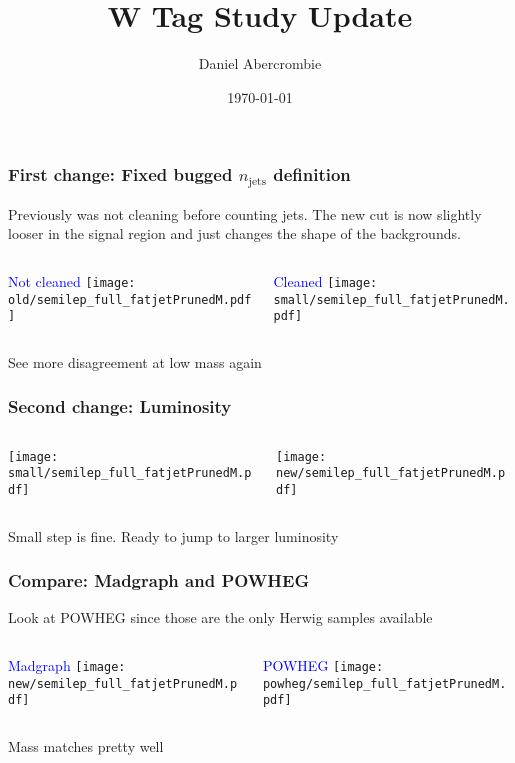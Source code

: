 \documentclass{beamer}
\author[D. Abercrombie]{
  Daniel Abercrombie
}
\title{\bf \sffamily W Tag Study Update}
\date{\today}
\begin{document}
\begin{frame}[nonumbering]
  \titlepage
\end{frame}

\begin{frame}
  \frametitle{First change: Fixed bugged $n_\text{jets}$ definition}
  Previously was not cleaning before counting jets.
  The new cut is now slightly looser in the signal region and just changes the shape of the backgrounds.
  \vspace{6pt}
  \begin{columns}
    \begin{column}{0.5\linewidth}
      \centering
      \textcolor{blue}{Not cleaned}
      \texttt{[image: old/semilep\_full\_fatjetPrunedM.pdf]}
    \end{column}
    \begin{column}{0.5\linewidth}
      \centering
      \textcolor{blue}{Cleaned}
      \texttt{[image: small/semilep\_full\_fatjetPrunedM.pdf]}
    \end{column}
  \end{columns}
  See more disagreement at low mass again
\end{frame}

\begin{frame}
  \frametitle{Second change: Luminosity}
  \begin{columns}
    \begin{column}{0.5\linewidth}
      \centering
      \texttt{[image: small/semilep\_full\_fatjetPrunedM.pdf]}
    \end{column}
    \begin{column}{0.5\linewidth}
      \centering
      \texttt{[image: new/semilep\_full\_fatjetPrunedM.pdf]}
    \end{column}
  \end{columns}
  Small step is fine. Ready to jump to larger luminosity
\end{frame}

\begin{frame}
  \frametitle{Compare: Madgraph and POWHEG}
  Look at POWHEG since those are the only Herwig samples available
  \vspace{6pt}
  \begin{columns}
    \begin{column}{0.5\linewidth}
      \centering
      \textcolor{blue}{Madgraph}
      \texttt{[image: new/semilep\_full\_fatjetPrunedM.pdf]}
    \end{column}
    \begin{column}{0.5\linewidth}
      \centering
      \textcolor{blue}{POWHEG}
      \texttt{[image: powheg/semilep\_full\_fatjetPrunedM.pdf]}
    \end{column}
  \end{columns}
  Mass matches pretty well
\end{frame}
\end{document}
